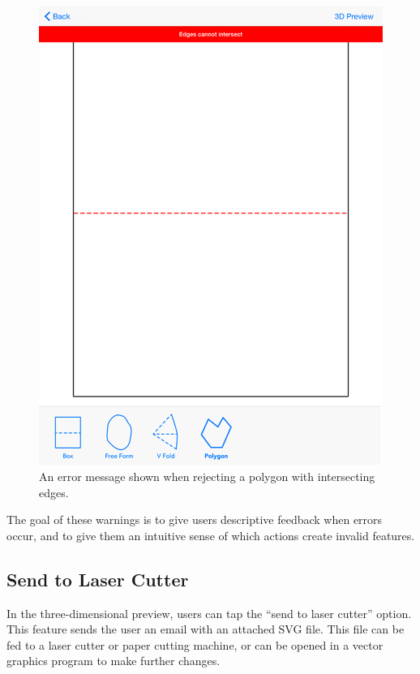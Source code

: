 \begin{figure}[htbp]
\centering
\includegraphics{figures/32_UI_Tool_Interactions/error_message.png}
\caption{An error message shown when rejecting a polygon with
intersecting edges.}
\end{figure}

The goal of these warnings is to give users descriptive feedback when
errors occur, and to give them an intuitive sense of which actions
create invalid features.

\subsection{Send to Laser Cutter}\label{send-to-laser-cutter}

In the three-dimensional preview, users can tap the ``send to laser
cutter'' option. This feature sends the user an email with an attached
SVG file. This file can be fed to a laser cutter or paper cutting
machine, or can be opened in a vector graphics program to make further
changes.

